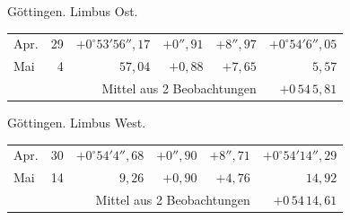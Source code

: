 \noindent\begin{minipage}[t]{.495\textwidth}\centering Göttingen. Limbus Ost.\par\smallskip
{\scriptsize\setlength{\tabcolsep}{1pt}\renewcommand{\arraystretch}{1.2}\begin{tabular}{lr|r|r|r|r|}
Apr.&29&$+0^\circ53'56''{,}17$&$+0''{,}91$&$+8''{,}97$&$+0^\circ54'6''{,}05$\\
Mai&4&$57{,}04$&$+0{,}88$&$+7{,}65$&$5{,}57$\\
\cline{6-6}\multicolumn{5}{r}{Mittel aus 2 Beobachtungen}&$+0\,54\,5{,}81$
\end{tabular}}\end{minipage}\hfill\begin{minipage}[t]{.495\textwidth}\centering Göttingen. Limbus West.\par\smallskip
{\scriptsize\setlength{\tabcolsep}{1pt}\renewcommand{\arraystretch}{1.2}\begin{tabular}{lr|r|r|r|r}
Apr.&30&$+0^\circ54'4''{,}68$&$+0''{,}90$&$+8''{,}71$&$+0^\circ54'14''{,}29$\\
Mai&14&$9{,}26$&$+0{,}90$&$+4{,}76$&$14{,}92$\\
\cline{6-6}\multicolumn{5}{r}{Mittel aus 2 Beobachtungen}&$+0\,54\,14{,}61$
\end{tabular}}\end{minipage}
\par\vspace{4mm}

